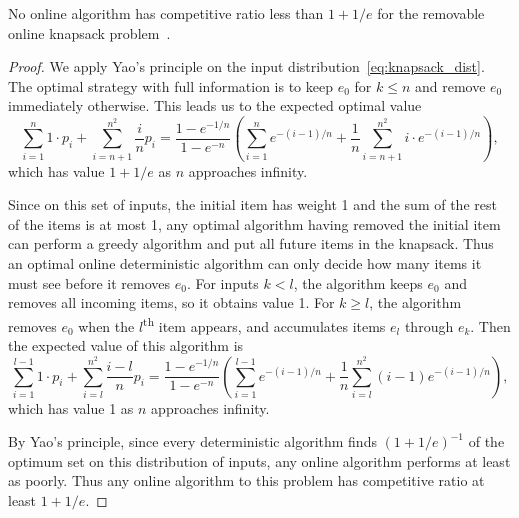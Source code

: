 \begin{theorem}
	No online algorithm has competitive ratio less than $1+1/e$ for the removable online knapsack problem~\cite{han}.
\end{theorem}
\begin{proof}
	We apply Yao's principle on the input distribution~\eqref{eq:knapsack_dist}. The optimal strategy with full information is to keep $e_0$ for $k\le n$ and remove $e_0$ immediately otherwise. This leads us to the expected optimal value
	\[ \sum_{i=1}^n 1\cdot p_i + \sum_{i=n+1}^{n^2} \frac{i}{n} p_i = \frac{1-e^{-1/n}}{1-e^{-n}} \left( \sum_{i=1}^n e^{-(i-1)/n} + \frac{1}{n} \sum_{i=n+1}^{n^2} i\cdot e^{-(i-1)/n} \right), \]
	which has value $1+1/e$ as $n$ approaches infinity.

	Since on this set of inputs, the initial item has weight 1 and the sum of the rest of the items is at most 1, any optimal algorithm having removed the initial item can perform a greedy algorithm and put all future items in the knapsack. Thus an optimal online deterministic algorithm can only decide how many items it must see before it removes $e_0$. For inputs $k<l$, the algorithm keeps $e_0$ and removes all incoming items, so it obtains value 1. For $k\ge l$, the algorithm removes $e_0$ when the $l$\textsuperscript{th} item appears, and accumulates items $e_l$ through $e_k$. Then the expected value of this algorithm is
	\[ \sum_{i=1}^{l-1} 1\cdot p_i + \sum_{i=l}^{n^2} \frac{i-l}{n} p_i = \frac{1-e^{-1/n}}{1-e^{-n}} \left( \sum_{i=1}^{l-1} e^{-(i-1)/n} + \frac{1}{n} \sum_{i=l}^{n^2} (i-1) e^{-(i-1)/n} \right), \]
which has value 1 as $n$ approaches infinity.

By Yao's principle, since every deterministic algorithm finds $(1+1/e)^{-1}$ of the optimum set on this distribution of inputs, any online algorithm performs at least as poorly. Thus any online algorithm to this problem has competitive ratio at least $1+1/e$.
\end{proof}


